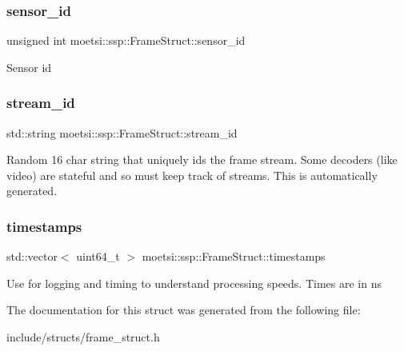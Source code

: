 \subsubsection{\texorpdfstring{sensor\+\_\+id}{sensor\_id}}
{\footnotesize\ttfamily unsigned int moetsi\+::ssp\+::\+Frame\+Struct\+::sensor\+\_\+id}

Sensor id \mbox{\label{structmoetsi_1_1ssp_1_1FrameStruct_a14a7976abfb26a9ca42e17555f8b1a8c}} 
\subsubsection{\texorpdfstring{stream\+\_\+id}{stream\_id}}
{\footnotesize\ttfamily std\+::string moetsi\+::ssp\+::\+Frame\+Struct\+::stream\+\_\+id}

Random 16 char string that uniquely ids the frame stream. Some decoders (like video) are stateful and so must keep track of streams. This is automatically generated. \mbox{\label{structmoetsi_1_1ssp_1_1FrameStruct_aa445729218d4963e527377d760ac8015}} 
\subsubsection{\texorpdfstring{timestamps}{timestamps}}
{\footnotesize\ttfamily std\+::vector$<$ uint64\+\_\+t $>$ moetsi\+::ssp\+::\+Frame\+Struct\+::timestamps}

Use for logging and timing to understand processing speeds. Times are in ns 

The documentation for this struct was generated from the following file\+:\begin{DoxyCompactItemize}
\item 
include/structs/frame\+\_\+struct.\+h\end{DoxyCompactItemize}
